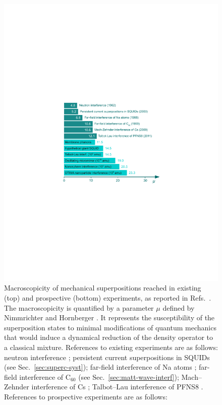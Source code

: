 \documentclass[3p,sort&compress]{elsarticle}
\begin{document}
\begin{figure}
\centering
\includegraphics[scale=0.76]{macro2.pdf}
\caption{Macroscopicity of mechanical superpositions reached in existing (top) and prospective (bottom) experiments, as reported in Refs.~\cite{Nimmrichter:2013:aa, Arndt:2014:oo}. The macroscopicity is quantified by a parameter $\mu$ defined by Nimmrichter and Hornberger \cite{Nimmrichter:2013:aa}. It represents the susceptibility of the superposition states to minimal modifications of quantum mechanics that would induce a dynamical reduction of the density operator to a classical mixture. References to existing experiments are as follows: neutron interference \cite{Zeilinger:1982:oo}; persistent current superpositions in SQUIDs \cite{Friedman:2000:rr} (see Sec.~\ref{sec:superc-syst}); far-field interference of Na atoms \cite{Keith:1988:uu}; far-field interference of C$_{60}$ \cite{Arndt:1999:rc} (see Sec.~\ref{sec:matt-wave-interf}); Mach--Zehnder interference of Cs \cite{Chung:2009:oo}; Talbot--Lau interference of PFNS8 \cite{Gerlich:2011:aa}. References to prospective experiments are as follows: 
}
\end{figure}
\end{document}

